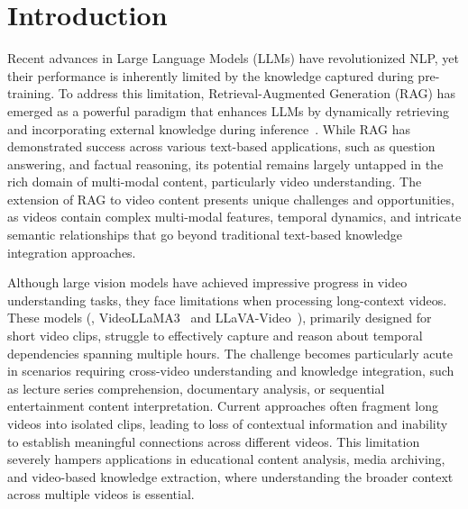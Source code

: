 \section{Introduction}\label{sec:intro}

Recent advances in Large Language Models (LLMs) have revolutionized NLP, yet their performance is inherently limited by the knowledge captured during pre-training. To address this limitation, Retrieval-Augmented Generation (RAG) has emerged as a powerful paradigm that enhances LLMs by dynamically retrieving and incorporating external knowledge during inference~\cite{ChunkRAG,gutierrez2024hipporag}. While RAG has demonstrated success across various text-based applications, such as question answering, and factual reasoning, its potential remains largely untapped in the rich domain of multi-modal content, particularly video understanding. The extension of RAG to video content presents unique challenges and opportunities, as videos contain complex multi-modal features, temporal dynamics, and intricate semantic relationships that go beyond traditional text-based knowledge integration approaches.

Although large vision models have achieved impressive progress in video understanding tasks, they face limitations when processing long-context videos. These models (\eg, VideoLLaMA3~\cite{VideoLLaMA3} and LLaVA-Video~\cite{LLaVA-Video}), primarily designed for short video clips, struggle to effectively capture and reason about temporal dependencies spanning multiple hours. The challenge becomes particularly acute in scenarios requiring cross-video understanding and knowledge integration, such as lecture series comprehension, documentary analysis, or sequential entertainment content interpretation. Current approaches often fragment long videos into isolated clips, leading to loss of contextual information and inability to establish meaningful connections across different videos. This limitation severely hampers applications in educational content analysis, media archiving, and video-based knowledge extraction, where understanding the broader context across multiple videos is essential.

